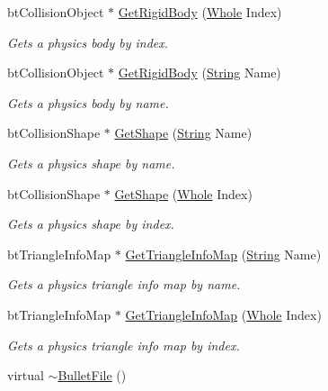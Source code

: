 \begin{DoxyCompactItemize}
btCollisionObject $\ast$ \hyperlink{classphys_1_1internal_1_1BulletFile_a4c489fe604a139dcba9048b7b38ca385}{GetRigidBody} (\hyperlink{namespacephys_a460f6bc24c8dd347b05e0366ae34f34a}{Whole} Index)
\begin{DoxyCompactList}\small\item\em Gets a physics body by index. \item\end{DoxyCompactList}\item 
btCollisionObject $\ast$ \hyperlink{classphys_1_1internal_1_1BulletFile_a0eaf586c53e740d31e9cad0cac8d5f6d}{GetRigidBody} (\hyperlink{namespacephys_aa03900411993de7fbfec4789bc1d392e}{String} Name)
\begin{DoxyCompactList}\small\item\em Gets a physics body by name. \item\end{DoxyCompactList}\item 
btCollisionShape $\ast$ \hyperlink{classphys_1_1internal_1_1BulletFile_a9786392b58a7c591bfa58f74dde4b914}{GetShape} (\hyperlink{namespacephys_aa03900411993de7fbfec4789bc1d392e}{String} Name)
\begin{DoxyCompactList}\small\item\em Gets a physics shape by name. \item\end{DoxyCompactList}\item 
btCollisionShape $\ast$ \hyperlink{classphys_1_1internal_1_1BulletFile_ad98701ff57511b91d065ce30cc0c8db7}{GetShape} (\hyperlink{namespacephys_a460f6bc24c8dd347b05e0366ae34f34a}{Whole} Index)
\begin{DoxyCompactList}\small\item\em Gets a physics shape by index. \item\end{DoxyCompactList}\item 
btTriangleInfoMap $\ast$ \hyperlink{classphys_1_1internal_1_1BulletFile_ae7e01fa7e3fd93d42e905de5876d1062}{GetTriangleInfoMap} (\hyperlink{namespacephys_aa03900411993de7fbfec4789bc1d392e}{String} Name)
\begin{DoxyCompactList}\small\item\em Gets a physics triangle info map by name. \item\end{DoxyCompactList}\item 
btTriangleInfoMap $\ast$ \hyperlink{classphys_1_1internal_1_1BulletFile_a1aeafb312ef9d91d9136b4db7acf1d40}{GetTriangleInfoMap} (\hyperlink{namespacephys_a460f6bc24c8dd347b05e0366ae34f34a}{Whole} Index)
\begin{DoxyCompactList}\small\item\em Gets a physics triangle info map by index. \item\end{DoxyCompactList}\item 
\hypertarget{classphys_1_1internal_1_1BulletFile_a0ef76dc36736fccd81b6d94bef69671f}{
virtual \hyperlink{classphys_1_1internal_1_1BulletFile_a0ef76dc36736fccd81b6d94bef69671f}{$\sim$BulletFile} ()}
\label{classphys_1_1internal_1_1BulletFile_a0ef76dc36736fccd81b6d94bef69671f}


\end{DoxyCompactItemize}
